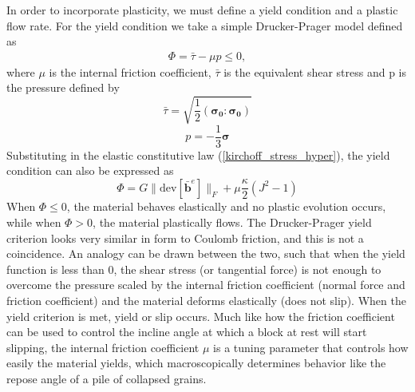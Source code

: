 In order to incorporate plasticity, we must define a yield condition and a plastic flow rate. For the yield condition we take a simple Drucker-Prager model defined as
\begin{align}
\Phi = \bar{\tau} - \mu p \leq 0,
\end{align}
where $\mu$ is the internal friction coefficient, $\bar{\tau}$ is the equivalent shear stress and p is the pressure defined by
\begin{equation}
\bar{\tau}=\sqrt{\frac{1}{2}(\bm{\sigma_0}:\bm{\sigma_0})}\label{tau_bar}
\end{equation}
\begin{equation}
p=-\frac{1}{3}\bm{\sigma}\label{pressure_stress}
\end{equation}
Substituting in the elastic constitutive law (\ref{kirchoff_stress_hyper}), the yield condition can also be expressed as
\begin{equation}
\Phi = G \|  \text{dev}[ \bar{\bm{b}}^e ] \|_F + \mu \frac{\kappa}{2} \left( J^2 - 1 \right) \label{yield_hyper_strain}
\end{equation}
When $\Phi \leq 0$, the material behaves elastically and no plastic evolution occurs, while when $\Phi > 0$, the material plastically flows. The Drucker-Prager yield criterion looks very similar in form to Coulomb friction, and this is not a coincidence. An analogy can be drawn between the two, such that when the yield function is less than 0, the shear stress (or tangential force) is not enough to overcome the pressure scaled by the internal friction coefficient (normal force and friction coefficient) and the material deforms elastically (does not slip). When the yield criterion is met, yield or slip occurs. Much like how the friction coefficient can be used to control the incline angle at which a block at rest will start slipping, the internal friction coefficient $\mu$ is a tuning parameter that controls how easily the material yields, which macroscopically determines behavior like the repose angle of a pile of collapsed grains.


